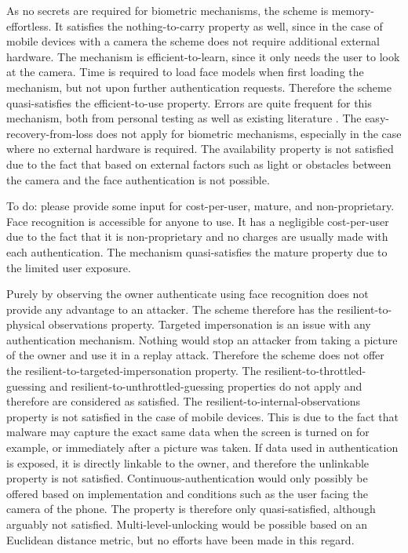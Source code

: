 	As no secrets are required for biometric mechanisms, the scheme is memory-effortless. It satisfies the nothing-to-carry property as well, since in the case of mobile devices with a camera the scheme does not require additional external hardware. The mechanism is efficient-to-learn, since it only needs the user to look at the camera. Time is required to load face models when first loading the mechanism, but not upon further authentication requests. Therefore the scheme quasi-satisfies the efficient-to-use property. Errors are quite frequent for this mechanism, both from personal testing as well as existing literature \cite{stajano2000resurrecting}. The easy-recovery-from-loss does not apply for biometric mechanisms, especially in the case where no external hardware is required. The availability property is not satisfied due to the fact that based on external factors such as light or obstacles between the camera and the face authentication is not possible.
	
	
	To do: please provide some input for cost-per-user, mature, and non-proprietary. Face recognition is accessible for anyone to use. It has a negligible cost-per-user due to the fact that it is non-proprietary and no charges are usually made with each authentication. The mechanism quasi-satisfies the mature property due to the limited user exposure.
	
	Purely by observing the owner authenticate using face recognition does not provide any advantage to an attacker. The scheme therefore has the resilient-to-physical observations property. Targeted impersonation is an issue with any authentication mechanism. Nothing would stop an attacker from taking a picture of the owner and use it in a replay attack. Therefore the scheme does not offer the resilient-to-targeted-impersonation property. The resilient-to-throttled-guessing and resilient-to-unthrottled-guessing properties do not apply and therefore are considered as satisfied.  The resilient-to-internal-observations property is not satisfied in the case of mobile devices. This is due to the fact that malware may capture the exact same data when the screen is turned on for example, or immediately after a picture was taken. If data used in authentication is exposed, it is directly linkable to the owner, and therefore the unlinkable property is not satisfied. Continuous-authentication would only possibly be offered based on implementation and conditions such as the user facing the camera of the phone. The property is therefore only quasi-satisfied, although arguably not satisfied. Multi-level-unlocking would be possible based on an Euclidean distance metric, but no efforts have been made in this regard. 

